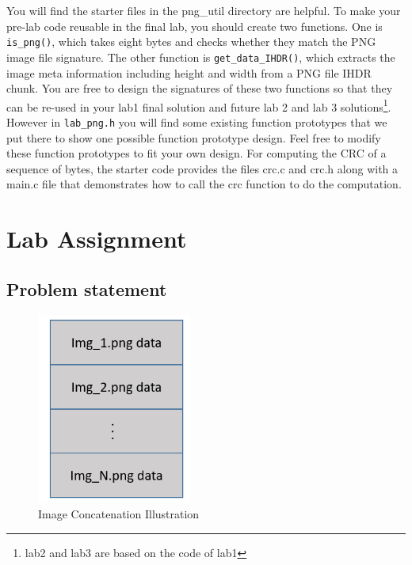 You will find the starter files in the png\_util directory are helpful. To make your pre-lab code reusable in the final lab, you should create two functions. One is \verb+is_png()+, which takes eight bytes and checks whether they match the PNG image file signature. The other function is \verb+get_data_IHDR()+, which extracts the image meta information including height and width from a PNG file IHDR chunk. You are free to design the signatures of these two functions so that they can be re-used in your lab1 final solution and future lab 2 and lab 3 solutions\footnote{lab2 and lab3 are based on the code of lab1}. However in \verb+lab_png.h+ you will find some existing function prototypes that we put there to show one possible function prototype design. Feel free to modify these function prototypes to fit your own design. For computing the CRC of a sequence of bytes, the starter code provides the files crc.c and crc.h along with a main.c file that demonstrates how to call the crc function to do the computation.
\section{Lab Assignment}
\subsection{Problem statement}

\begin{figure}
  \includegraphics[width=2in]{img/img_concatenation}
  \caption{Image Concatenation Illustration}
\label{fig_img_concatenation}
\end{figure}


